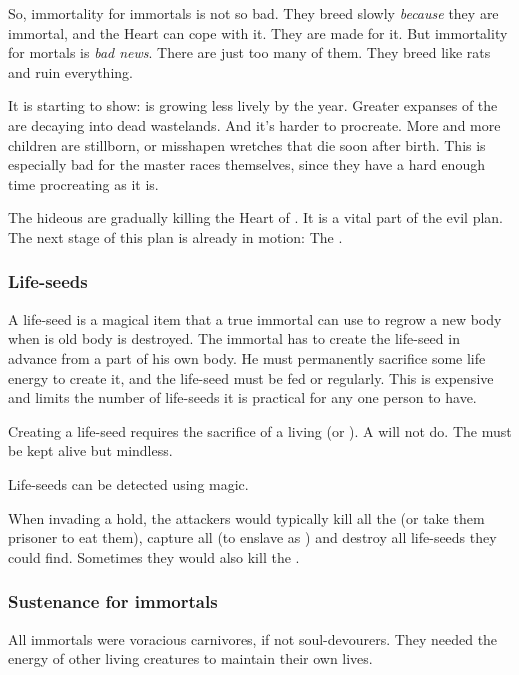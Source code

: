 So, immortality for immortals is not so bad. 
They breed slowly \emph{because} they are immortal, and the Heart can cope with it. 
They are made for it. 
But immortality for mortals is \emph{bad news}. 
There are just too many of them.
They breed like rats and ruin everything. 

It is starting to show: 
\Miith{} is growing less lively by the year. 
Greater expanses of the \Wylde{} are decaying into dead wastelands. 
And it's harder to procreate. 
More and more children are stillborn, or misshapen wretches that die soon after birth. 
This is especially bad for the master races themselves, since they have a hard enough time procreating as it is. 

The hideous \sephiroth{} are gradually killing the Heart of \Miith{}. 
It is a vital part of the \psp{\banelords}{} evil plan. 
The next stage of this plan is already in motion: 
The . 





\subsubsection{Life-seeds}
A life-seed is a magical item that a true immortal can use to regrow a new body when is old body is destroyed. 
The immortal has to create the life-seed in advance from a part of his own body.
He must permanently sacrifice some life energy to create it, and the life-seed must be fed or  regularly.
This is expensive and limits the number of life-seeds it is practical for any one person to have. 

Creating a \resphan life-seed requires the sacrifice of a living \human (or \resphan). 
A \nephil will not do. 
The \human must be kept alive but mindless. 

Life-seeds can be detected using magic.

When invading a \resphan hold, the attackers would typically kill all the \resphain (or take them prisoner to eat them), capture all \resviel (to enslave as \yurideth) and destroy all life-seeds they could find.
Sometimes they would also kill the \humans.





\subsubsection{Sustenance for immortals}
All immortals were voracious carnivores, if not soul-devourers. 
They needed the energy of other living creatures to maintain their own lives. 









